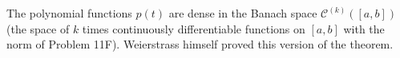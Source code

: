 The polynomial functions $p(t)$ are dense in the Banach space $\mathcal{C}^{(k)}([a, b])$ (the space of $k$ times continuously differentiable functions on $[a,b]$ with the norm of Problem 11F). Weierstrass himself proved this version of the theorem.
